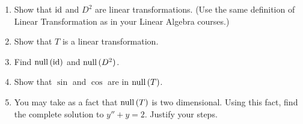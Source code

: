 \begin{enumerate}
	\begin{enumerate}
		\item Show that $\operatorname{id}$ and $D^2$ are linear transformations. (Use the same definition of Linear Transformation as in your Linear Algebra courses.)
		\item Show that $T$ is a linear transformation.
		\item Find $\mathrm{null}\,(\operatorname{id})$ and $\mathrm{null}\,(D^2)$.
		\item Show that $\sin$ and $\cos$ are in $\mathrm{null}\,(T)$.
		\item You may take as a fact that $\mathrm{null}\,(T)$ is two dimensional. Using this fact, find the complete solution to $y''+y=2$. Justify your steps.
	\end{enumerate}

\end{enumerate}
